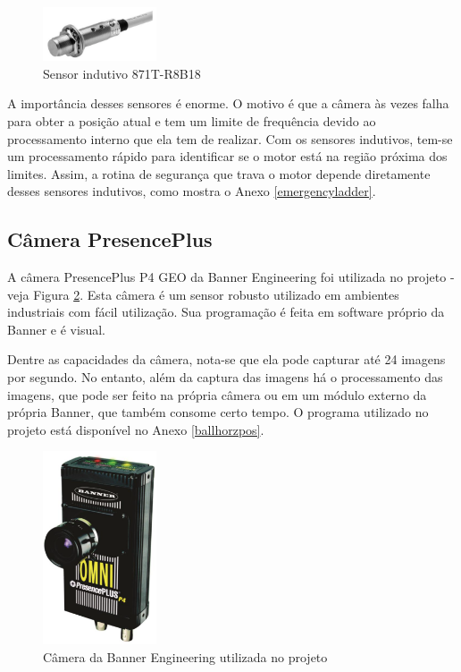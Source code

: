 \begin{figure}[!ht]
  \centering
    \includegraphics[width=0.3\textwidth]{figs/fundamentos/sensorIndutivo}
    \caption{Sensor indutivo 871T-R8B18 \cite{redytton}\label{sensorIndutivo}}
\end{figure}

A importância desses sensores é enorme. O motivo é que a câmera às vezes falha para obter a posição atual e tem um limite de frequência devido ao processamento interno que ela tem de realizar. Com os sensores indutivos, tem-se um processamento rápido para identificar se o motor está na região próxima dos limites. Assim, a rotina de segurança que trava o motor depende diretamente desses sensores indutivos, como mostra o Anexo \ref{emergencyladder}.

\subsection{Câmera PresencePlus}

A câmera PresencePlus P4 GEO da Banner Engineering foi utilizada no projeto - veja Figura \ref{cameraBanner}. Esta câmera é um sensor robusto utilizado em ambientes industriais com fácil utilização. Sua programação é feita em software próprio da Banner e é visual.

Dentre as capacidades da câmera, nota-se que ela pode capturar até 24 imagens por segundo. No entanto, além da captura das imagens há o processamento das imagens, que pode ser feito na própria câmera ou em um módulo externo da própria Banner, que também consome certo tempo. O programa utilizado no projeto está disponível no Anexo \ref{ballhorzpos}.

\begin{figure}[!ht]
  \centering
    \includegraphics[width=0.3\textwidth]{figs/fundamentos/camera}
    \caption{Câmera da Banner Engineering utilizada no projeto \cite{redytton}\label{cameraBanner}}
\end{figure}

